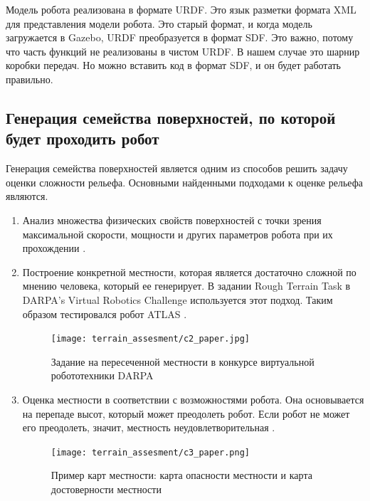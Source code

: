 Модель робота реализована в формате URDF. Это язык разметки формата XML для представления модели робота. Это старый формат, и когда модель загружается в Gazebo, URDF преобразуется в формат SDF. Это важно, потому что часть функций не реализованы в чистом URDF. В нашем случае это шарнир коробки передач. Но можно вставить код в формат SDF, и он будет работать правильно.

\subsection{Генерация семейства поверхностей, по которой будет проходить робот}
Генерация семейства поверхностей является одним из способов решить задачу оценки сложности рельефа. Основными найденными подходами к оценке рельефа являются.
\begin{enumerate} 
    \item Анализ множества физических свойств поверхностей с точки зрения максимальной скорости, мощности и других параметров робота при их прохождении \cite{Altendorfer2001}.
    \item Построение конкретной местности, которая является достаточно сложной по мнению человека, который ее генерирует. В задании Rough Terrain Task в DARPA's Virtual Robotics Challenge используется этот подход. Таким образом тестировался робот ATLAS \cite{feng_Optimizationbased_2015} .
          
          \begin{figure}[H]
              \centering\texttt{[image: terrain\_assesment/c2\_paper.jpg]}
              \caption{Задание на пересеченной местности в конкурсе виртуальной робототехники DARPA}
              \label{fig:terrain_assesment/c2_paper.jpg}
          \end{figure}
          
    \item Оценка местности в соответствии с возможностями робота. Она основывается на перепаде высот, который может преодолеть робот. Если робот не может его преодолеть, значит, местность неудовлетворительная \cite{hung_Advanced_2004,Howard2000} .
          
          \begin{figure}[H]
              \centering\texttt{[image: terrain\_assesment/c3\_paper.png]}
              \caption{Пример карт местности: карта опасности местности и карта достоверности местности}
              \label{fig:terrain_assesment/c3_paper.png}
          \end{figure}


\end{enumerate}
